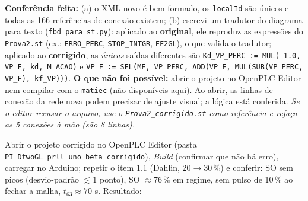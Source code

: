 \textbf{Conferência feita:} (a) o XML novo é bem formado, os \texttt{localId} são únicos e todas as 166 referências de conexão existem; (b) escrevi um tradutor do diagrama para texto (\texttt{fbd\_para\_st.py}): aplicado ao \textbf{original}, ele reproduz as expressões do \texttt{Prova2.st} (ex.: \texttt{ERRO\_PERC}, \texttt{STOP\_INTGR}, \texttt{FF2GL}), o que valida o tradutor; aplicado ao \textbf{corrigido}, as \emph{únicas} saídas diferentes são \texttt{Kd\_VP\_PERC := MUL(-1.0, VP\_F, kd, M\_ACAO)} e \texttt{VP\_F := SEL(MF, VP\_PERC, ADD(VP\_F, MUL(SUB(VP\_PERC, VP\_F), kf\_VP)))}. \textbf{O que não foi possível:} abrir o projeto no OpenPLC Editor nem compilar com o \texttt{matiec} (não disponíveis aqui). Ao abrir, as linhas de conexão da rede nova podem precisar de ajuste visual; a lógica está conferida. \emph{Se o editor recusar o arquivo, use o \texttt{Prova2\_corrigido.st} como referência e refaça as 5 conexões à mão (são 8 linhas).}

\begin{todo}Abrir o projeto corrigido no OpenPLC Editor (pasta \texttt{PI\_DtwoGL\_prll\_uno\_beta\_corrigido}), \emph{Build} (confirmar que não há erro), carregar no Arduino; repetir o item 1.1 (Dahlin, 20$\to$30\,\%) e conferir: SO sem picos (desvio-padrão $\lesssim1$ ponto), SO $\approx76\,\%$ em regime, sem pulso de 10\,\% ao fechar a malha, $t_{63}\approx70$ s. Resultado: \underline{\hspace{6cm}}\end{todo}

